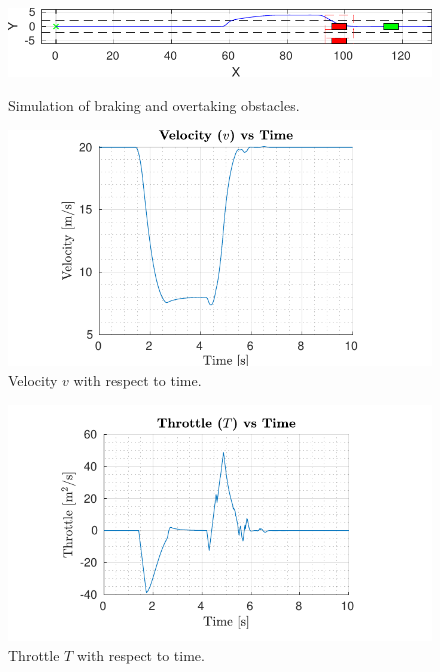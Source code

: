 \documentclass[conference, 11pt]{IEEEtran}
\begin{document}
\begin{figure}[!h]
\begin{minipage}[t]{\columnwidth}
		\label{fig:braking_5}
	\end{minipage}
	\begin{minipage}[t]{\columnwidth}
		\includegraphics[width=1\columnwidth]{../../MATLAB/three_obstacles_no_overtaking/figure/braking_6.pdf}
		\label{fig:braking_6}
	\end{minipage}	
	\caption{Simulation of braking and overtaking obstacles.}
\end{figure}
\begin{figure}[!h]
	\centering
	\includegraphics[width=1\columnwidth]{../../MATLAB/three_obstacles_no_overtaking/figure/VelocityVsTime.pdf}
	\caption{Velocity $v$ with respect to time.}
	\label{fig:velocity_braking}
\end{figure}
\begin{figure}[!h]
	\centering
	\includegraphics[width=1\columnwidth]{../../MATLAB/three_obstacles_no_overtaking/figure/ThrottleVsTime.pdf}
	\caption{Throttle $T$ with respect to time.}
	\label{fig:throttle_braking}
\end{figure}
\end{document}
